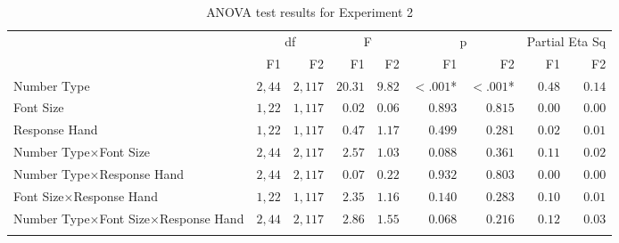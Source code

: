 \documentclass[output=paper]{langscibook}
\begin{document}
\begin{table}[t]
\caption{ANOVA test results for Experiment 2}
\label{gul-bla:tab:ANOVA-exp2}
\begin{tabularx}{\textwidth}{X r@{~~}r r@{~~}r r@{~~}r r@{}r}
\lsptoprule
\multirow{2}{*}{Source}  & \multicolumn{2}{c}{df} & \multicolumn{2}{c}{F} & \multicolumn{2}{c}{p}               & \multicolumn{2}{c}{Partial Eta Sq} \\
\cmidrule(lr){2-3}\cmidrule(lr){4-5}\cmidrule(lr){6-7}\cmidrule(lr){8-9}
                 & F1      & F2    & F1     & F2    & F1       & F2     & F1      & F2    \\
\midrule
Number Type &
  $2, 44$ &
  $2, 117$ &
  $20.31$ &
  $9.82$ &
  $<.001$\parbox{0mm}{*} & %
  $<.001$\parbox{0mm}{*} & %
  $0.48$ &
  $0.14$ \\
  \tablevspace
Font Size &
  $1, 22$ &
  $1, 117$ &
  $0.02$ &
  $0.06$ &
  $0.893$ &
  $0.815$ &
  $0.00$ &
  $0.00$ \\
  \tablevspace
Response Hand &
  $1, 22$ &
  $1, 117$ &
  $0.47$ &
  $1.17$ &
  $0.499$ &
  $0.281$ &
  $0.02$ &
  $0.01$ \\
  \tablevspace
Number Type×\newline Font Size &
  $2, 44$ &
  $2, 117$ &
  $2.57$ &
  $1.03$ &
  $0.088$ &
  $0.361$ &
  $0.11$ &
  $0.02$ \\
  \tablevspace
Number Type×\newline Response Hand &
  $2, 44$ &
  $2, 117$ &
  $0.07$ &
  $0.22$ &
  $0.932$ &
  $0.803$ &
  $0.00$ &
  $0.00$ \\
  \tablevspace
Font Size×\newline Response Hand &
  $1, 22$ &
  $1, 117$ &
  $2.35$ &
  $1.16$ &
  $0.140$ &
  $0.283$ &
  $0.10$ &
  $0.01$ \\
  \tablevspace
Number Type×\newline Font Size×\newline Response Hand &
  $2, 44$ &
  $2, 117$ &
  $2.86$ &
  $1.55$ &
  $0.068$ &
  $0.216$ &
  $0.12$ &
  $0.03$ \\
\lspbottomrule
\end{tabularx}
\end{table}

\end{document}
